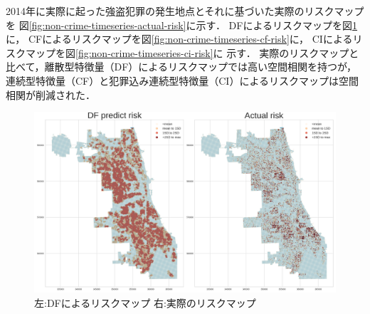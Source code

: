 

2014年に実際に起った強盗犯罪の発生地点とそれに基づいた実際のリスクマップを
図\ref{fig:non-crime-timeseries-actual-risk}に示す．
DFによるリスクマップを図\ref{fig:non-crime-timeseries-df-risk}に，
CFによるリスクマップを図\ref{fig:non-crime-timeseries-cf-risk}に，
CIによるリスクマップを図\ref{fig:non-crime-timeseries-ci-risk}に
示す．
実際のリスクマップと比べて，離散型特徴量（DF）によるリスクマップでは高い空間相関を持つが，
連続型特徴量（CF）と犯罪込み連続型特徴量（CI）によるリスクマップは空間相関が削減された．




\begin{figure}[H]
  \centering %
  \includegraphics[scale=0.15]{./non-crime-timeseries-fig/DF_riskmap.png}
  \caption{左:DFによるリスクマップ 右:実際のリスクマップ}
  \label{fig:non-crime-timeseries-df-risk}
\end{figure}


